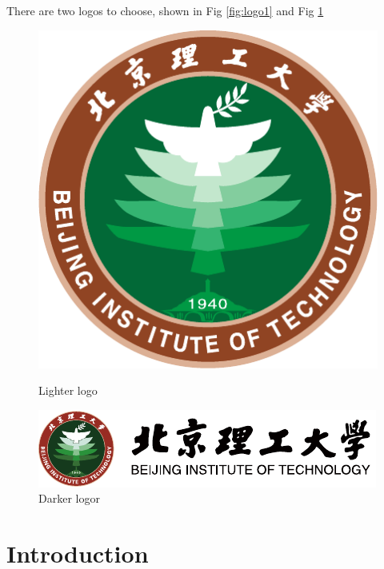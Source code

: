 \documentclass[11pt,english, openany]{book}
\begin{document}
There are two logos to choose, shown in Fig \ref{fig:logo1} and Fig \ref{fig:logo2}
\begin{figure}[h]
	\centering
	\begin{minipage}[c]{0.4\linewidth}
		\includegraphics[width=\linewidth]{Figures/bit_logo.pdf}
		\caption{Lighter logo}
		\label{fig:logo1}
	\end{minipage}
	\hspace{1.4cm}
	\begin{minipage}[c]{0.4\linewidth}
		\includegraphics[width=\linewidth]{Figures/logo_01.pdf}
		\caption{Darker logor}
		\label{fig:logo2}
	\end{minipage}%
\end{figure}

\chapter{Introduction}\label{chapt:intro}
\end{document}
